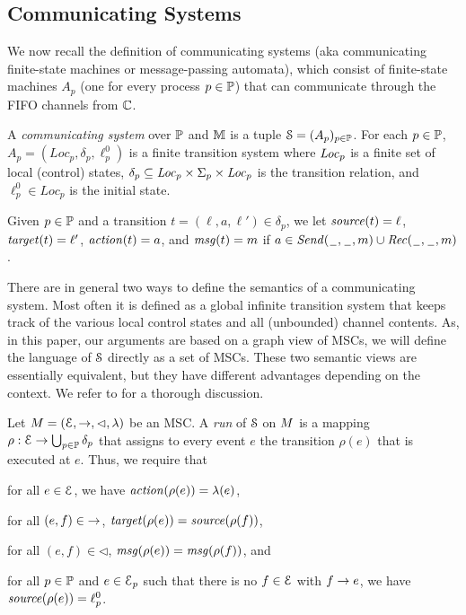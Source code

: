\documentclass[a4paper,UKenglish,cleveref, autoref, thm-restate]{lipics-v2021}
\begin{document}
\subsection{Communicating Systems}

We now recall the definition of communicating systems (aka communicating finite-state
machines or message-passing automata), which consist of finite-state machines $A_p$
(one for every process $p \in \mathbb{P}$) that can communicate through the FIFO channels
from $\mathbb{C}$.

\begin{definition}\label{def:cs}
A \emph{communicating system} over $\mathbb{P}$ and $\mathbb{M}$ is a tuple
   $ \mathcal{S} = (A_p)_{p\in\mathbb{P}}$. For each
   $p \in \mathbb{P}$, $A_p = (Loc_p, \delta_p, \ell^0_p)$ is a finite transition system where
   $\mathit{Loc}_p$ is a finite set of local (control) states, $\delta_p
   \subseteq \mathit{Loc}_p \times \Sigma_{p} \times \mathit{Loc}_p$ is the
   transition relation, and $\ell^0_p \in Loc_p$ is the initial state.
\end{definition}

Given $p \in \mathbb{P}$ and a transition $t = (\ell,a,\ell') \in \delta_p$, we let
$\mathit{source}(t) = \ell$, $\mathit{target}(t) = \ell'$, $\mathit{action}(t) = a$, and
$\mathit{msg}(t) = m$ if $a \in {\mathit{Send}(\hspace{0.1em}\underline{\hspace{0.5em}}\hspace{0.1em},\hspace{0.1em}\underline{\hspace{0.5em}}\hspace{0.1em},m)} \cup {\mathit{Rec}(\hspace{0.1em}\underline{\hspace{0.5em}}\hspace{0.1em},\hspace{0.1em}\underline{\hspace{0.5em}}\hspace{0.1em},m)}$.

\smallskip

There are in general two ways to define the semantics of a communicating system.
Most often it is defined as a global infinite transition system that keeps track
of the various local control states and all (unbounded) channel contents.
As, in this paper, our arguments are based on a graph view of MSCs, we will define
the language of $\mathcal{S}$ directly as a set of MSCs. These two semantic views are essentially
equivalent, but they have different advantages depending on the context.
We refer to \cite{CyriacG14} for a thorough discussion.

Let $M = (\mathcal{E},\to,\lhd,\lambda)$ be an MSC.
A \emph{run} of $\mathcal{S}$ on $M$ is a mapping
$\rho: \mathcal{E} \to \bigcup_{p \in \mathbb{P}} \delta_p$
that assigns to every event $e$ the transition $\rho(e)$
that is executed at $e$. Thus, we require that
\begin{enumerate*}[label={(\roman*)}]
\item for all $e \in \mathcal{E}$, we have $\mathit{action}(\rho(e)) = \lambda(e)$,
\item for all $(e,f) \in {\to}$, $\mathit{target}(\rho(e)) = \mathit{source}(\rho(f))$,
\item for all $(e,f) \in {\lhd}$, $\mathit{msg}(\rho(e)) = \mathit{msg}(\rho(f))$,
and
\item for all $p \in \mathbb{P}$ and $e \in \mathcal{E}_p$ such that there is no $f \in \mathcal{E}$ with $f \to e$, we have $\mathit{source}(\rho(e)) = \ell_p^0$.
\end{enumerate*}
\end{document}
